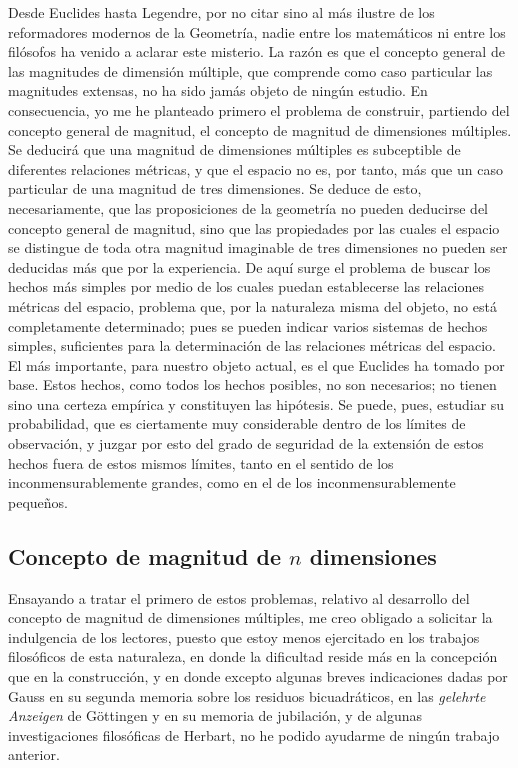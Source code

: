 \documentclass[a4paper, 12pt]{article}
\begin{document}
Desde Euclides hasta Legendre, por no citar sino al más ilustre de los reformadores modernos de la Geometría, nadie entre los matemáticos ni entre los filósofos ha venido a aclarar este misterio.  La razón es que el concepto general de las magnitudes de dimensión múltiple, que comprende como caso particular las magnitudes extensas, no ha sido jamás objeto de ningún estudio.  En consecuencia, yo me he planteado primero el problema de construir, partiendo del concepto general de magnitud, el concepto de magnitud de dimensiones múltiples.  Se deducirá que una magnitud de dimensiones múltiples es subceptible de diferentes relaciones métricas, y que el espacio no es, por tanto, más que un caso particular de una magnitud de tres dimensiones.  Se deduce de esto, necesariamente, que las proposiciones de la geometría no pueden deducirse del concepto general de magnitud, sino que las propiedades por las cuales el espacio se distingue de toda otra magnitud imaginable de tres dimensiones no pueden ser deducidas más que por la experiencia.  De aquí surge el problema de buscar los hechos más simples por medio de los cuales
puedan establecerse las relaciones métricas del espacio, problema que, por la naturaleza misma del objeto, no está completamente determinado; pues se pueden indicar varios sistemas de hechos simples, suficientes para  la determinación de las relaciones métricas del espacio. El más importante, para nuestro objeto actual, es el que Euclides ha tomado por base. Estos hechos, como todos los hechos posibles, no son necesarios; no tienen sino una certeza empírica y constituyen las hipótesis. Se puede, pues, estudiar su probabilidad, que es ciertamente muy considerable dentro de los límites de observación, y juzgar por esto del grado de seguridad de la extensión de estos hechos fuera de estos mismos límites,  tanto en el sentido de los inconmensurablemente grandes, como en el de los inconmensurablemente pequeños.


\subsection*{Concepto de magnitud de $n$ dimensiones}


Ensayando a tratar el primero de estos problemas, relativo al desa\-rrollo del concepto de magnitud de dimensiones múltiples, me creo obligado a solicitar la indulgencia de los lectores, puesto que estoy menos ejercitado en los trabajos filosóficos de esta naturaleza, en donde la dificultad reside más en la concepción que en la construcción, y en donde excepto algunas breves indicaciones dadas por Gauss en su segunda memoria sobre los residuos bicuadráticos, en las \textit{gelehrte Anzeigen} de Göttingen y en su memoria de jubilación, y de algunas investigaciones filosóficas de Herbart, no he podido ayudarme de ningún trabajo anterior.
\end{document}

